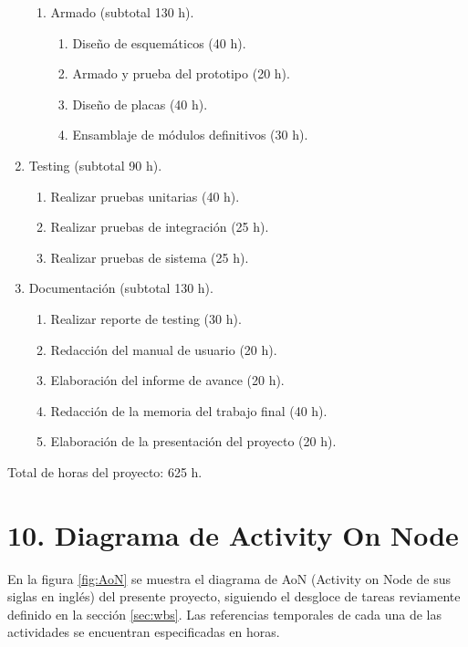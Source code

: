 \documentclass[
11pt, %
codirector, %
]{charter}
\begin{document}
\begin{enumerate}
\begin{enumerate}
	\item Armado (subtotal 130 h).
	
		\begin{enumerate}
			\item Diseño de esquemáticos (40 h).
			\item Armado y prueba del prototipo (20 h).
			\item Diseño de placas (40 h).
			\item Ensamblaje de módulos definitivos (30 h).
		
		\end{enumerate}
		
	\end{enumerate}
	
\item Testing (subtotal 90 h).
	\begin{enumerate}
	\item Realizar pruebas unitarias (40 h).
	\item Realizar pruebas de integración (25 h).
	\item Realizar pruebas de sistema (25 h).
	\end{enumerate}
	
\item Documentación (subtotal 130 h).
	\begin{enumerate}
	\item Realizar reporte de testing (30 h).
	\item Redacción del manual de usuario (20 h).
	\item Elaboración del informe de avance (20 h).
	\item Redacción de la memoria del trabajo final (40 h).
	\item Elaboración de la presentación del proyecto (20 h).
	\end{enumerate}
	
\end{enumerate}

Total de horas del proyecto: 625 h.

\section{10. Diagrama de Activity On Node}
\label{sec:AoN}

En la figura \ref{fig:AoN} se muestra el diagrama de AoN (Activity on Node de sus siglas en inglés) del presente proyecto, siguiendo el desgloce de tareas reviamente definido en la sección \ref{sec:wbs}. Las referencias temporales de cada una de las actividades se encuentran especificadas en horas. 
\end{document}
